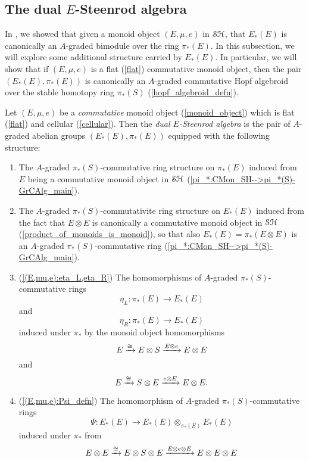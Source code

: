\documentclass[../main.tex]{subfiles}
\begin{document}
\subsection{The dual \texorpdfstring{$E$}{E}-Steenrod algebra}

In , we showed that given a monoid object $(E,\mu,e)$ in $\mathcal{SH}$, that $E_*(E)$ is canonically an $A$-graded bimodule over the ring $\pi_*(E)$. In this subsection, we will explore some additional structure carried by $E_*(E)$. In particular, we will show that if $(E,\mu,e)$ is a flat (\autoref{flat}) commutative monoid object, then the pair $(E_*(E),\pi_*(E))$ is canonically an $A$-graded commutative Hopf algebroid over the stable homotopy ring $\pi_*(S)$ (\autoref{hopf_algebroid_defn}). 

\begin{definition}\label{dual_E-Steenrod_algebra_defn}
    Let $(E,\mu,e)$ be a \emph{commutative} monoid object (\autoref{monoid_object}) which is flat (\autoref{flat}) and cellular (\autoref{cellular}). Then the \emph{dual $E$-Steenrod algebra} is the pair of $A$-graded abelian groups $(E_*(E),\pi_*(E))$ equipped with the following structure:\begin{enumerate}[label={\arabic*.}]
        \item The $A$-graded $\pi_*(S)$-commutative ring structure on $\pi_*(E)$
        induced from $E$ being a commutative monoid object in $\mathcal{SH}$ (\autoref{pi_*:CMon_SH-->pi_*(S)-GrCAlg_main}).
        \item The $A$-graded $\pi_*(S)$-commutativite ring structure on $E_*(E)$ induced from the fact that $E\otimes E$ is canonically a commutative monoid object in $\mathcal{SH}$ (\autoref{product_of_monoids_is_monoid}), so that also $E_*(E)=\pi_*(E\otimes E)$ is an $A$-graded $\pi_*(S)$-commutative ring (\autoref{pi_*:CMon_SH-->pi_*(S)-GrCAlg_main}).
        \item (\autoref{(E,mu,e):eta_L,eta_R}) The homomorphisms of $A$-graded $\pi_*(S)$-commutative rings
        \[\eta_L:\pi_*(E)\to E_*(E)\]
        and
        \[\eta_R:\pi_*(E)\to E_*(E)\]
        induced under $\pi_*$ by the monoid object homomorphisms
        \[E\xrightarrow\cong E\otimes S\xrightarrow{E\otimes e}E\otimes E\]
        and
        \[E\xrightarrow\cong S\otimes E\xrightarrow{e\otimes E}E\otimes E.\]
        \item (\autoref{(E,mu,e):Psi_defn}) The homomorphism of $A$-graded $\pi_*(S)$-commutative rings
        \[\Psi:E_*(E)\to E_*(E)\otimes_{\pi_*(E)}E_*(E)\]
        induced under $\pi_*$ from
        \[E\otimes E\xrightarrow\cong E\otimes S\otimes E\xrightarrow{E\otimes e\otimes E}E\otimes E\otimes E\]

\end{enumerate}
\end{definition}
\end{document}
